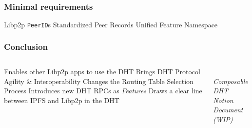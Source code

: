 \documentclass{../pl-slide}
\begin{document}
\begin{frame}
\frametitle{Minimal requirements}

\begin{itemize}
	\itemc Libp2p
	\itemc \texttt{PeerID}s
	\itemc Standardized Peer Records
	\itemc Unified Feature Namespace
\end{itemize}
\end{frame}

\begin{frame}
\frametitle{Conclusion}

\begin{columns}[onlytextwidth]
	\begin{column}{0.69\textwidth}
	\begin{itemize}
		\itemc Enables other Libp2p apps to use the DHT
		\itemc Brings DHT Protocol Agility \& Interoperability
		\itemc Changes the Routing Table Selection Process
		\itemc Introduces new DHT RPCs as \textit{Features}
		\itemc Draws a clear line between IPFS and Libp2p in the DHT
	\end{itemize}
	\end{column}
	\begin{column}{0.29\textwidth}
		\begin{center}
			\\
			\smallskip
			\textit{Composable DHT Notion Document (WIP)}
		\end{center}
	\end{column}
\end{columns}
\end{frame}
\end{document}

